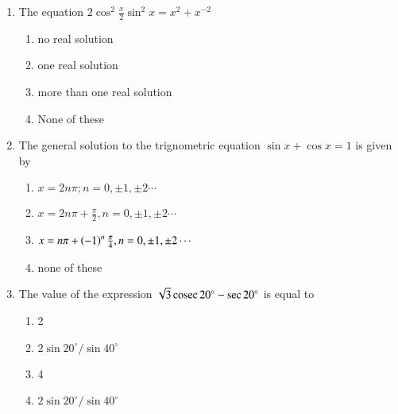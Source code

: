 \documentclass[journal,12pt,twocolumn]{IEEEtran}
\theoremstyle{remark}
\begin{document}
\begin{enumerate}
	\item The equation $2\cos^{2}\frac{x}{2}\sin^{2}x = x^{2} +x^{-2}$  
		\hfill{}
      
		\begin{enumerate}[label=(\alph*)]
			\item no real solution
	  		\item one real solution
			\item more than one real solution 
			\item None of these
		\end{enumerate}
  


	\item The general solution to the trignometric equation $ \sin x + \cos x = 1$ is given by
		\hfill{}
  
		\begin{enumerate}[label=(\alph*)]
			\item $x=2n\pi;n=0,\pm1,\pm2 \cdots$
			\item  $x = 2n\pi + \frac{\pi}{2}, n = 0, \pm 1, \pm 2 \cdots $
			\item $x=n\pi+\left(-1\right)^{n}\frac{\pi}{4},n = 0,\pm 1,\pm 2 \cdots $ 
			\item none of these
		\end{enumerate}
  


	\item The value of the expression $\sqrt{3}\,\text{cosec}\, 20^{\circ} - \sec 20^{\circ} $ is equal to 
		\hfill{}
  
			\begin{enumerate}[label=(\alph*)]
				\item 2 
  				\item $2\sin 20^{\circ}/\sin40^{\circ}$
  				\item 4 
				\item $2\sin20^{\circ}/\sin40^{\circ}$
			\end{enumerate}
  
  
\end{enumerate}
\end{document}
